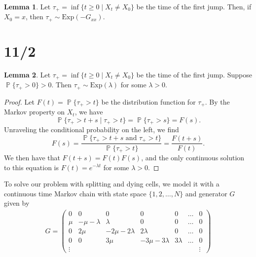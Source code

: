 \documentclass[../../../Master/AppliedStochastics.tex]{subfiles}
\theoremstyle{definition}
\newtheorem{lem}{Lemma}
\DeclareMathOperator{\p}{\mathbb{P}}
\begin{document}
\begin{lem} 
Let $\tau_+ = \inf\{ t\geq 0 \mid X_t \neq X_0\}$ be the time of the first jump. Then, if $X_{0} = x$, then $\tau_+ \sim \text{Exp}(-G_{xx})$.

\end{lem}



\section*{11/2}

\begin{lem}
	Let $\tau_+ = \inf\{ t\geq 0 \mid X_t \neq X_0\}$ be the time of the first jump. Suppose $\p\{\tau_+ > 0\} >0$. Then $\tau_+ \sim \text{Exp}(\lambda)$ for some $\lambda>0$. 
\end{lem}
\begin{proof}
	Let $F(t) = \p\{\tau_+ > t\}$ be the distribution function for $\tau_+$. By the Markov property on $X_t$, we have
	\[
		\p\{\tau_+ > t+s \mid \tau_+ > t\} = \p\{\tau_+ > s\} = F(s).
	\]
	Unraveling the conditional probability on the left, we find 
	\[
	F(s) = \frac{\p\{\tau_+>t+s \text{ and } \tau_+ > t\}}{\p\{\tau_+ > t\}} = \frac{F(t+s)}{F(t)}.
	\]
	We then have that $F(t+s) = F(t) F(s)$, and the only continuous solution to this equation is $F(t) = e^{-\lambda t}$ for some $\lambda >0$.
	
\end{proof}

To solve our problem with splitting and dying cells, we model it with a continuous time Markov chain with state space $\{1, 2, \dots, N\}$ and generator $G$ given by
\begin{align*}
	G = \begin{pmatrix}
		0 & 0 & 0 & 0 & 0 &\dots & 0\\
		\mu & -\mu-\lambda & \lambda & 0 & 0 & \dots & 0\\
		0 & 2\mu & -2\mu-2\lambda & 2\lambda & 0 & \dots & 0\\
		0 & 0 & 3\mu & -3\mu-3\lambda & 3\lambda & \dots & 0 \\
		\vdots & & & & & & \vdots 
	\end{pmatrix}
\end{align*}
\end{document}
